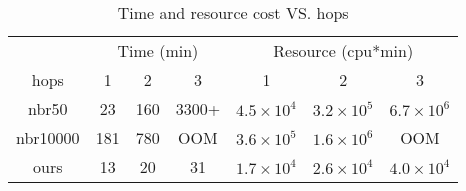 \documentclass[conference]{IEEEtran}
\begin{document}
\begin{table}
	\centering
	\caption{Time and resource cost VS. hops}
	\label{tab:time_cost_hops}
		\begin{tabular}{ccccccc}
		\toprule
		{} &\multicolumn{3}{c}{Time (min)} & \multicolumn{3}{c}{Resource (cpu*min)} \\
		\cmidrule(lr){2-4}
		\cmidrule(lr){5-7}
		hops& 1 &2 &3 & 1 &2 &3 \\
		\midrule
		 nbr50& 23 & 160 &3300+ &$4.5\times 10^4$ & $3.2\times 10^5$ & $6.7 \times 10^6$\\
		 nbr10000& 181 & 780 &{OOM} &$3.6\times 10^5$ & $1.6\times 10^6$ & {OOM} \\
		 \cmidrule(lr){1-7}	
		 ours &13 &20 &31 &$1.7\times 10^4$ &$2.6\times10^4$ &$4.0\times10^4$ \\
		\bottomrule
	\end{tabular}
\end{table}

\end{document}
